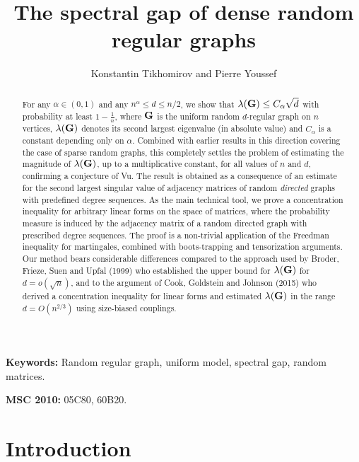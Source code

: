 \documentclass[12pt]{article}
\date{}
\title{The spectral gap of dense random regular graphs}
\author{Konstantin Tikhomirov and Pierre Youssef}
\theoremstyle{definition}
\theoremstyle{plain}
\def\rangr{{\bf{}G}}
\begin{document}
\maketitle

\begin{abstract}
For any $\alpha\in (0,1)$ and any $n^{\alpha}\leq d\leq n/2$, we show that $\lambda(\rangr)\leq C_\alpha \sqrt{d}$ 
with probability at least $1-\frac{1}{n}$, where $\rangr$ is the uniform random $d$-regular graph on $n$ vertices,  
$\lambda(\rangr)$ denotes its second largest eigenvalue (in absolute value) and $C_\alpha$ is a constant depending only on $\alpha$. 
Combined with earlier results in this direction covering the case of sparse random graphs, 
this completely settles the problem of estimating the magnitude of $\lambda(\rangr)$, up to a multiplicative constant, for all values of $n$ and $d$, 
confirming a conjecture of Vu. 
The result is obtained as a consequence of an estimate for the second largest singular value of adjacency
matrices of random {\it directed} graphs with predefined degree sequences.
As the main technical tool, we prove a concentration inequality for arbitrary linear forms
on the space of matrices, where the probability measure is induced by the adjacency matrix of a random
directed graph with prescribed degree sequences. The proof
is a non-trivial application of the Freedman inequality for martingales,
combined with boots-trapping and tensorization arguments.
Our method bears considerable differences compared
to the approach used by
Broder, Frieze, Suen and Upfal (1999) who established the upper bound for $\lambda(\rangr)$
for $d=o(\sqrt{n})$, and to the argument of
Cook, Goldstein and Johnson (2015)
who derived a concentration inequality for linear forms
and estimated $\lambda(\rangr)$ in the range $d= O(n^{2/3})$
using size-biased couplings.
\end{abstract}

{\bf Keywords:} Random regular graph, uniform model, spectral gap, random matrices.

{\bf MSC 2010:} 05C80, %
                        60B20. %

\section{Introduction}
\end{document}
